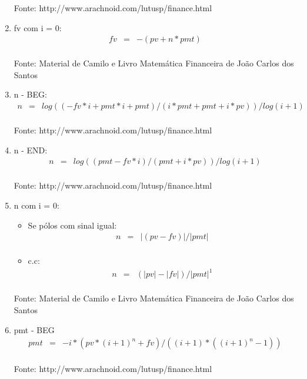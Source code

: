 \documentclass[a4paper,10pt]{article}
\begin{document}
\begin{enumerate}
 Fonte: http://www.arachnoid.com/lutusp/finance.html 

\item fv com i = 0:
\begin{eqnarray*}
 fv &=& - (pv + n*pmt) \\
\end{eqnarray*}
 
 Fonte: Material de Camilo e Livro Matemática Financeira de João Carlos dos Santos 

\item  n - BEG:
\begin{eqnarray*}
 n &=& log( (-fv*i + pmt*i + pmt) / (i*pmt + pmt + i*pv) ) / log(i+1) \\
\end{eqnarray*}

  Fonte: http://www.arachnoid.com/lutusp/finance.html 

\item  n - END: 
\begin{eqnarray*}
 n &=& log( (pmt - fv*i) / (pmt + i*pv) ) / log(i+1) \\
\end{eqnarray*}
  
 Fonte: http://www.arachnoid.com/lutusp/finance.html

\item  n com i = 0: 

\begin{itemize}
 \item Se pólos com sinal igual:
	\begin{eqnarray*}
 		 n &=& |(pv - fv)| / |pmt| \\ 		
	\end{eqnarray*}
  \item c.c:
	\begin{eqnarray*}
 		n &=& (|pv| - |fv|) / |pmt|   ^{1} \\	 
	\end{eqnarray*}
\end{itemize}
 
 Fonte: Material de Camilo e Livro Matemática Financeira de João Carlos dos Santos 

\item  pmt - BEG 
\begin{eqnarray*}
	pmt &=& - i*( pv* ( i+1 )^{n} + fv ) / ( (i+1)*( (i+1)^{n} - 1 ) ) \\
\end{eqnarray*}
 
 Fonte: http://www.arachnoid.com/lutusp/finance.html \\ 


\end{enumerate}
\end{document}
